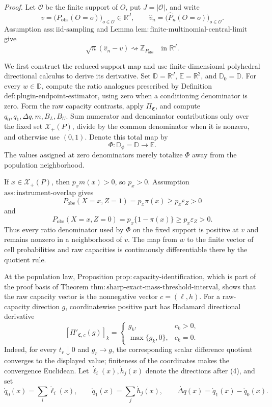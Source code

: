 \noindent\textit{Proof.}
Let \(\mathcal O\) be the finite support of \(O\), put
\(J=|\mathcal O|\), and write
\[
v=\bigl(P_{\mathrm{obs}}(O=o)\bigr)_{o\in\mathcal O}\in\mathbb R^J,
\qquad
\widehat v_n=
\bigl(\widehat P_n(O=o)\bigr)_{o\in\mathcal O}.
\]
Assumption \(\mathrm{ass{:}iid\text{-}sampling}\) and Lemma
\(\mathrm{lem{:}finite\text{-}multinomial\text{-}central\text{-}limit}\)
give
\[
\sqrt n(\widehat v_n-v)\rightsquigarrow
\mathbb Z_{P_{\mathrm{obs}}}
\quad\text{in }\mathbb R^J.
\tag{1}
\]

We first construct the reduced-support map and use finite-dimensional
polyhedral directional calculus to derive its derivative.  Set
\(\mathbb D=\mathbb R^J\), \(\mathbb E=\mathbb R^2\), and
\(\mathbb D_0=\mathbb D\).  For every \(w\in\mathbb D\), compute the
ratio analogues prescribed by Definition
\(\mathrm{def{:}plugin\text{-}endpoint\text{-}estimator}\), using zero
when a conditioning denominator is zero.  Form the raw capacity contrasts,
apply \(\Pi_{\mathfrak C}\), and compute
\(q_0,q_1,\Delta q,m,B_L,B_U\).  Sum numerator and denominator
contributions only over the fixed set \(\mathcal X_+(P)\), divide by the
common denominator when it is nonzero, and otherwise use \((0,1)\).
Denote this total map by
\[
\Phi:\mathbb D_\phi=\mathbb D\longrightarrow\mathbb E.
\tag{2}
\]
The values assigned at zero denominators merely totalize \(\Phi\) away
from the population neighborhood.

If \(x\in\mathcal X_+(P)\), then \(p_xm(x)>0\), so \(p_x>0\).
Assumption \(\mathrm{ass{:}instrument\text{-}overlap}\) gives
\[
P_{\mathrm{obs}}(X=x,Z=1)=p_x\pi(x)
\ge p_x\varepsilon_Z>0
\]
and
\[
P_{\mathrm{obs}}(X=x,Z=0)=p_x\{1-\pi(x)\}
\ge p_x\varepsilon_Z>0.
\tag{3}
\]
Thus every ratio denominator used by \(\Phi\) on the fixed support is
positive at \(v\) and remains nonzero in a neighborhood of \(v\).  The
map from \(w\) to the finite vector of cell probabilities and raw
capacities is continuously differentiable there by the quotient rule.

At the population law, Proposition
\(\mathrm{prop{:}capacity\text{-}identification}\), which is part of the
proof basis of Theorem
\(\mathrm{thm{:}sharp\text{-}exact\text{-}mass\text{-}threshold\text{-}interval}\),
shows that the raw capacity vector is the nonnegative vector
\(c=(\ell,h)\).  For a raw-capacity direction \(g\), coordinatewise
positive part has Hadamard directional derivative
\[
[\Pi'_{\mathfrak C,c}(g)]_k=
\begin{cases}
g_k,&c_k>0,\\
\max\{g_k,0\},&c_k=0.
\end{cases}
\tag{4}
\]
Indeed, for every \(t_r\downarrow0\) and \(g_r\to g\), the corresponding
scalar difference quotient converges to the displayed value; finiteness
of the coordinates makes the convergence Euclidean.  Let
\(\dot\ell_i(x),\dot h_j(x)\) denote the directions after (4), and set
\[
\dot q_0(x)=\sum_i\dot\ell_i(x),\qquad
\dot q_1(x)=\sum_j\dot h_j(x),\qquad
\dot{\Delta q}(x)=\dot q_1(x)-\dot q_0(x).
\tag{5}
\]

